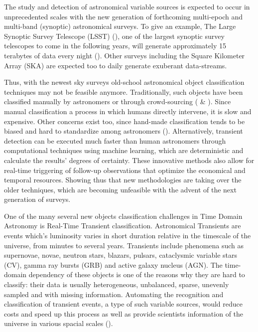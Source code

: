 
The study and detection of astronomical variable sources is expected to occur in unprecedented scales with the new generation of forthcoming multi-epoch and multi-band (synoptic) astronomical surveys. To give an example, The Large Synoptic Survey Telescope (LSST) (\cite{0805.2366}), one of the largest synoptic survey telescopes to come in the following years, will generate approximately 15 terabytes of data every night (\cite{1512.07914}). 
Other surveys including the Square Kilometer Array (SKA) are expected too to daily generate exuberant data-streams.

Thus, with the newest sky surveys old-school astronomical object classification techniques may not be feasible anymore. Traditionally, such objects have been classified manually by astronomers or through crowd-sourcing (\cite{1011.2199} \& \cite{0708.2750}). Since manual classification a process in which humans directly intervene, it is slow and expensive. Other concerns exist too, since hand-made classification tends to be biased and hard to standardize among astronomers (\cite{1104.3142}). Alternatively, transient detection can be executed much faster than human astronomers through computational techniques using machine learning, which are deterministic and calculate the results' degrees of certainty. These innovative methods also allow for real-time triggering of follow-up observations that optimize the economical and temporal resources. Showing thus that new methodologies are taking over the older techniques, which are becoming unfeasible with the advent of the next generation of surveys. 


One of the many several new objects classification challenges in Time Domain Astronomy is Real-Time Transient classification. Astronomical Transients are events which's luminosity varies in short duration relative in the timescale of the universe, from minutes to several years. Transients include phenomena such as supernovae, novae, neutron stars, blazars, pulsars, cataclysmic variable stars (CV), gamma ray bursts (GRB) and active galaxy nucleus (AGN). The time-domain dependency of these objects is one of the reasons why they are hard to classify: their data is usually heterogeneous, unbalanced, sparse, unevenly sampled and with missing information. Automating the recognition and classification of transient events, a type of such variable sources, would reduce costs and speed up this process as well as provide scientists information of the universe in various spacial scales (\cite{2011arXiv1110.4655D}).

